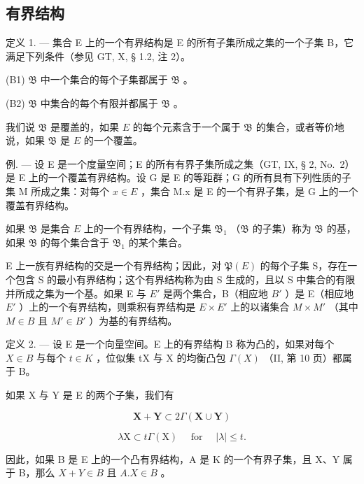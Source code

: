 \subsection{有界结构}

定义 1. --- 集合 E 上的一个有界结构是 E 的所有子集所成之集的一个子集 B，它满足下列条件（参见 GT, X, § 1.2, 注 2）。

(B1) \(\mathfrak{B}\) 中一个集合的每个子集都属于 \(\mathfrak{B}\) 。

(B2) \(\mathfrak{B}\) 中集合的每个有限并都属于 \(\mathfrak{B}\) 。

我们说 \(\mathfrak{B}\) 是覆盖的，如果 \(E\) 的每个元素含于一个属于 \(\mathfrak{B}\) 的集合，或者等价地说，如果 \(\mathfrak{B}\) 是 \(E\) 的一个覆盖。

例. --- 设 E 是一个度量空间；E 的所有有界子集所成之集（GT, IX, § 2, No.~2）是 E 上的一个覆盖有界结构。设 G 是 E 的等距群；G 的所有具有下列性质的子集 M 所成之集：对每个 \(x \in E\) ，集合 M.x 是 E 的一个有界子集，是 G 上的一个覆盖有界结构。

如果 \(\mathfrak{B}\) 是集合 \(E\) 上的一个有界结构，一个子集 \(\mathfrak{B}_1\) （\(\mathfrak{B}\) 的子集）称为 \(\mathfrak{B}\) 的基，如果 \(\mathfrak{B}\) 的每个集合含于 \(\mathfrak{B}_1\) 的某个集合。

E 上一族有界结构的交是一个有界结构；因此，对 \(\mathfrak{P}(E)\) 的每个子集 S，存在一个包含 S 的最小有界结构；这个有界结构称为由 S 生成的，且以 S 中集合的有限并所成之集为一个基。如果 E 与 \(E'\) 是两个集合，B（相应地 \(B'\) ）是 E（相应地 \(E'\) ）上的一个有界结构，则乘积有界结构是 \(E \times E'\) 上的以诸集合 \(M \times M'\) （其中 \(M \in B\) 且 \(M' \in B'\) ）为基的有界结构。

定义 2. --- 设 E 是一个向量空间。E 上的有界结构 B 称为凸的，如果对每个 \(X \in B\) 与每个 \(t \in K\) ，位似集 tX 与 X 的均衡凸包 \(\Gamma(X)\) （II, 第 10 页）都属于 B。

如果 X 与 Y 是 E 的两个子集，我们有

\[
\mathbf {X} + \mathbf {Y} \subset 2 \Gamma (\mathbf {X} \cup \mathbf {Y})
\]

\[
\lambda \mathrm{X} \subset t \Gamma (\mathrm{X}) \quad \text { for } \quad | \lambda | \leqslant t.
\]

因此，如果 B 是 E 上的一个凸有界结构，A 是 K 的一个有界子集，且 X、Y 属于 B，那么 \(X + Y \in B\) 且 \(A. X \in B\) 。

